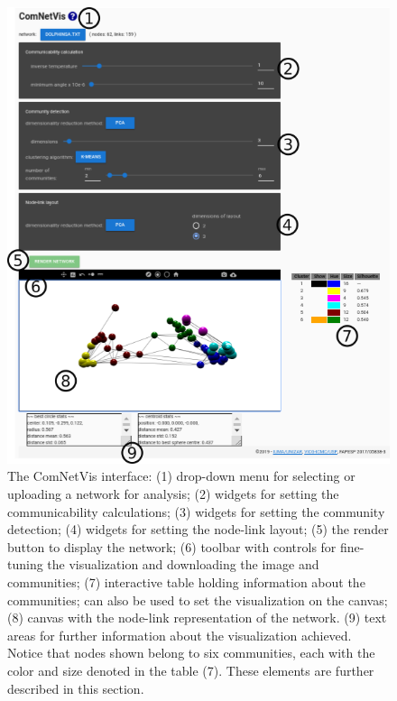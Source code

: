 \documentclass[Afour,sagev,times]{sagej}
\begin{document}
\begin{figure}\centering
 \includegraphics[width=\textwidth]{figs/overall}
  \caption{The ComNetVis interface: 
  (1) drop-down menu for selecting or uploading a network for analysis;
  (2) widgets for setting the communicability calculations;
  (3) widgets for setting the community detection;
  (4) widgets for setting the node-link layout;
  (5) the render button to display the network;
  (6) toolbar with controls for fine-tuning the visualization and downloading the image and communities;
  (7) interactive table holding information about the communities;
  can also be used to set the visualization on the canvas;
  (8) canvas with the node-link representation of the network.
  (9) text areas for further information about the visualization achieved.
  Notice that nodes shown belong to six communities, each with the color and size denoted in the table (7).
  These elements are further described in this section.
  }\label{fpage0}
\end{figure}
\end{document}
